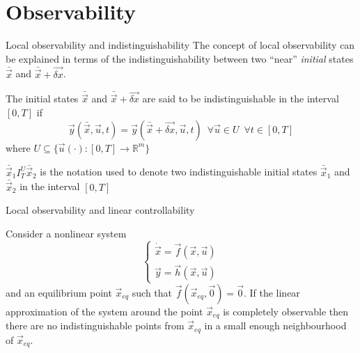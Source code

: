 \section{Observability}

\begin{frame}{Local observability and indistinguishability}
  The concept of local observability can be explained in terms of the indistinguishability
  between two ``near'' \emph{initial} states $\bar{\vec{x}}$ and $\bar{\vec{x}} + \vec{\delta x}$.
  \par
  The initial states $\bar{\vec{x}}$ and $\bar{\vec{x}} + \vec{\delta x}$ are said to be
  indistinguishable in the interval $[0, T]$ if
  \[
  \vec{y}(\bar{\vec{x}}, \vec{u}, t) = \vec{y}(\bar{\vec{x}} + \vec{\delta x}, \vec{u}, t)\enspace
  \forall \vec{u} \in U \enspace \forall t \in [0,T]
  \]
  where $U \subseteq \{\vec{u}(\cdot):[0,T] \rightarrow \mathbb{R}^{m}\}$
  \par
  $\bar{\vec{x}}_1 I^{U}_{T} \bar{\vec{x}}_2$ is the notation used to denote two indistinguishable initial states $\bar{\vec{x}}_1$
  and $\bar{\vec{x}}_2$ in the interval $[0,T]$

\end{frame}

\begin{frame}{Local observability and linear controllability}
  \begin{theorem}
    Consider a nonlinear system 
    \[
    \begin{cases}
      \dot{\vec{x}} = \vec{f}(\vec{x}, \vec{u})\\
      \vec{y} = \vec{h}(\vec{x}, \vec{u})
    \end{cases}
    \]
    and an equilibrium point $\vec{x}_{eq}$ such that $\vec{f}(\vec{x}_{eq}, \vec{0}) = \vec{0}$.
    If the linear approximation of the system around the point $\vec{x}_{eq}$ is completely
    observable then there are no indistinguishable points from $\vec{x}_{eq}$ in a small enough
    neighbourhood of $\vec{x}_{eq}$.
  \end{theorem}
\end{frame}

